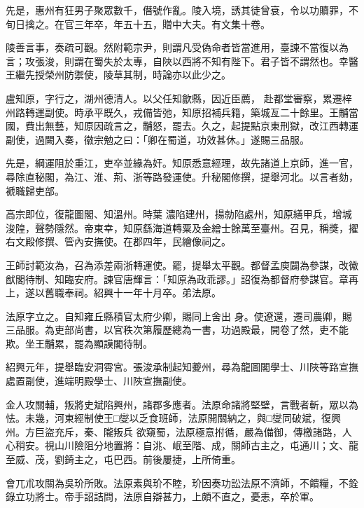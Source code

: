 \begin{pinyinscope}
 先是，惠州有狂男子聚眾數千，僭號作亂。陵入境，誘其徒曾袞，令以功贖罪，不旬日擒之。在官三年卒，年五十五，贈中大夫。有文集十卷。



 陵善言事，奏疏可觀。然附範宗尹，則謂凡受偽命者皆當進用，臺諫不當復以為言；攻張浚，則謂在蜀失於太專，自陜以西將不知有陛下。君子皆不謂然也。幸醫王繼先授榮州防禦使，陵草其制，時論亦以此少之。



 盧知原，字行之，湖州德清人。以父任知歙縣，因近臣薦，
 赴都堂審察，累遷梓州路轉運副使。時承平既久，戎備皆弛，知原招補兵籍，築城亙二十餘里。王黼當國，費出無藝，知原因疏言之，黼怒，罷去。久之，起提點京東刑獄，改江西轉運副使，過闕入奏，徽宗勉之曰：「卿在蜀道，功效甚休。」遂賜三品服。



 先是，綱運阻於重江，吏卒並緣為奸。知原悉意經理，故先諸道上京師，進一官，尋除直秘閣，為江、淮、荊、浙等路發運使。升秘閣修撰，提舉河北。以言者劾，褫職歸吏部。



 高宗即位，復龍圖閣、知溫州。時葉
 濃陷建州，揚勍陷處州，知原繕甲兵，增城浚隍，聲勢隱然。帝東幸，知原繇海道轉粟及金繒士餘萬至臺州。召見，稱獎，擢右文殿修撰、管內安撫使。在郡四年，民繪像祠之。



 王師討範汝為，召為添差兩浙轉運使。罷，提舉太平觀。都督孟庾闢為參謀，改徽猷閣待制、知臨安府。諫官唐輝言：「知原為政乖謬。」詔復為都督府參謀官。章再上，遂以舊職奉祠。紹興十一年十月卒。弟法原。



 法原字立之。自知雍丘縣積官太府少卿，賜同上舍出
 身。使遼還，遷司農卿，賜三品服。為吏部尚書，以官秩次第履歷總為一書，功過殿最，開卷了然，吏不能欺。坐王黼累，罷為顯謨閣待制。



 紹興元年，提舉臨安洞霄宮。張浚承制起知夔州，尋為龍圖閣學士、川陜等路宣撫處置副使，進端明殿學士、川陜宣撫副使。



 金人攻關輔，叛將史斌陷興州，諸郡多應者。法原命諸將堅壁，言戰者斬，眾以為怯。未幾，河東經制使王□燮以乏食班師，法原開關納之，與□燮同破斌，復興州。方巨盜充斥，秦、隴叛兵
 欲窺蜀，法原極意拊循，嚴為備御，傳檄諸路，人心稍安。視山川險阻分地置將：自洮、岷至階、成，關師古主之，屯通川；文、龍至威、茂，劉錡主之，屯巴西。前後屢捷，上所倚重。



 會兀朮攻關為吳玠所敗。法原素與玠不睦，玠因奏功訟法原不濟師，不饋糧，不銓錄立功將士。帝手詔詰問，法原自辯甚力，上頗不直之，憂恚，卒於軍。




\end{pinyinscope}
